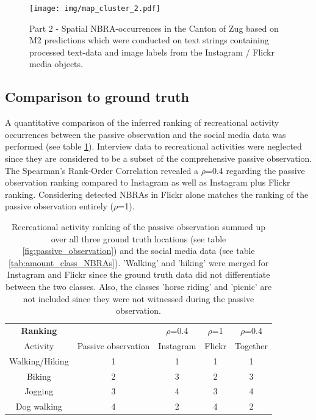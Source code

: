 \begin{figure}[h!]
   \centering
   \texttt{[image: img/map\_cluster\_2.pdf]}
   \caption{Part 2 - Spatial NBRA-occurrences in the Canton of Zug based on M2 predictions which were conducted on text strings containing processed text-data and image labels from the Instagram / Flickr media objects.}
   \label{fig:map_cluster_2}
\end{figure}

\subsection{Comparison to ground truth} \label{results_comp_ground_truth}
A quantitative comparison of the inferred ranking of recreational activity occurrences between the passive observation and the social media data was performed (see table \ref{tab:compare_ranking}). Interview data to recreational activities were neglected since they are considered to be a subset of the comprehensive passive observation. The Spearman's Rank-Order Correlation revealed a $\rho$=0.4 regarding the passive observation ranking compared to Instagram as well as Instagram plus Flickr ranking. Considering detected NBRAs in Flickr alone matches the ranking of the passive observation entirely ($\rho$=1). \\

\begin{table}[h!]
\begin{center}
\caption{Recreational activity ranking of the passive observation summed up over all three ground truth locations (see table \ref{fig:passive_observation}) and the social media data (see table \ref{tab:amount_class_NBRAs}). 'Walking' and 'hiking' were merged for Instagram and Flickr since the ground truth data did not differentiate between the two classes. Also, the classes 'horse riding' and 'picnic' are not included since they were not witnessed during the passive observation.}\vspace{1ex}
\label{tab:compare_ranking}
\begin{tabular}{ccccc}\hline
\textbf{\large{Ranking}}  & & $\rho$=0.4 & $\rho$=1 & $\rho$=0.4\\
Activity & Passive observation & Instagram & Flickr & Together\footnotemark\\ \hline
Walking/Hiking & 1 & 1 & 1 & 1\\
Biking & 2 & 3 & 2 & 3 \\
Jogging & 3 & 4 & 3 & 4\\
Dog walking & 4 & 2 & 4 & 2 \\
\hline
\end{tabular}
\end{center}
\end{table}

